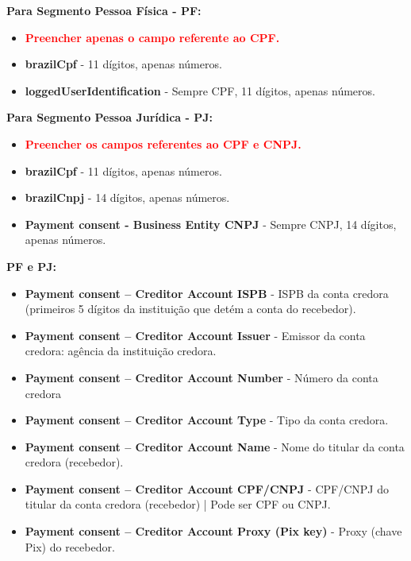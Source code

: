 \textbf{Para Segmento Pessoa Física - PF:}

\begin{itemize}
    \item \textbf{\textcolor{red}{Preencher apenas o campo referente ao CPF.}}
    \item \textbf{\textcolor{red!80}{brazilCpf}} - 11 dígitos, apenas números.
    \item \textbf{\textcolor{red!80}{loggedUserIdentification}} - Sempre CPF, 11 dígitos, apenas números.
\end{itemize}

\textbf{Para Segmento Pessoa Jurídica - PJ:}
\begin{itemize}
    \item \textbf{\textcolor{red}{Preencher os campos referentes ao CPF e CNPJ.}}
    \item \textbf{\textcolor{red!80}{brazilCpf}} - 11 dígitos, apenas números.
    \item \textbf{\textcolor{red!80}{brazilCnpj}} - 14 dígitos, apenas números.
    \item \textbf{\textcolor{red!80}{Payment consent - Business Entity CNPJ}} - Sempre CNPJ, 14 dígitos, apenas números.
\end{itemize}

\textbf{PF e PJ:}
\begin{itemize}
    \item \textbf{\textcolor{red!80}{Payment consent – Creditor Account ISPB}} - ISPB da conta credora (primeiros 5 dígitos da instituição que detém a conta do recebedor).
    \item \textbf{\textcolor{red!80}{Payment consent – Creditor Account Issuer}} - Emissor da conta credora: agência da instituição credora.
    \item \textbf{\textcolor{red!80}{Payment consent – Creditor Account Number}} - Número da conta credora
    \item \textbf{\textcolor{red!80}{Payment consent – Creditor Account Type}} - Tipo da conta credora.
    \item \textbf{\textcolor{red!80}{Payment consent – Creditor Account Name}} - Nome do titular da conta credora (recebedor).
    \item \textbf{\textcolor{red!80}{Payment consent – Creditor Account CPF/CNPJ}} - CPF/CNPJ do titular da conta credora (recebedor) | Pode ser CPF ou CNPJ.
    \item \textbf{\textcolor{red!80}{Payment consent – Creditor Account Proxy (Pix key)}} - Proxy (chave Pix) do recebedor.
\end{itemize}

